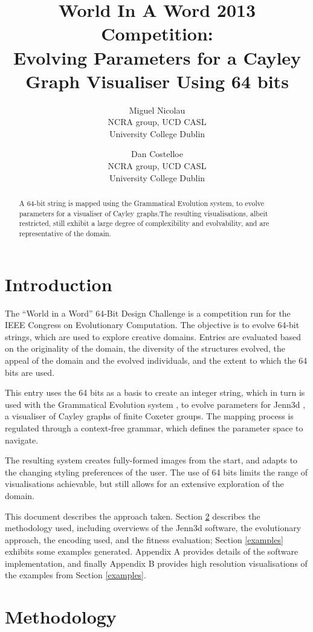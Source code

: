 \documentclass{article}
\title{World In A Word 2013 Competition:\\
Evolving Parameters for a Cayley Graph Visualiser Using 64 bits}
\author{Miguel Nicolau\\
NCRA group, UCD CASL\\
University College Dublin
\and Dan Costelloe\\
NCRA group, UCD CASL\\
University College Dublin}
\date{}
\begin{document}
\maketitle
\begin{abstract}
A 64-bit string is mapped using the Grammatical Evolution system, to evolve
parameters for a visualiser of Cayley graphs.The resulting visualisations,
albeit restricted, still exhibit a large degree of complexibility and
evolvability, and are representative of the domain.
\end{abstract}

\section{Introduction}
The ``World in a Word'' 64-Bit Design Challenge \cite{browne2013a} is a
competition run for the IEEE Congress on Evolutionary Computation. The
objective is to evolve 64-bit strings, which are used to explore creative
domains. Entries are evaluated based on the originality of the domain, the
diversity of the structures evolved, the appeal of the domain and the evolved
individuals, and the extent to which the 64 bits are used.

This entry uses the 64 bits as a basis to create an integer string, which in
turn is used with the Grammatical Evolution system \cite{oneill03b}, to
evolve parameters for Jenn3d \cite{obermeyer10a}, a visualiser of Cayley graphs of
finite Coxeter groups. The mapping process is regulated through a context-free
grammar, which defines the parameter space to navigate.

The resulting system creates fully-formed images from the start, and adapts to
the changing styling preferences of the user. The use of 64 bits limits the
range of visualisations achievable, but still allows for an extensive
exploration of the domain.

This document describes the approach taken. Section \ref{methodology} describes
the methodology used, including overviews of the Jenn3d software, the
evolutionary approach, the encoding used, and the fitness evaluation; Section
\ref{examples} exhibits some examples generated. Appendix A provides details of
the software implementation, and finally Appendix B provides high resolution
visualisations of the examples from Section \ref{examples}.

\section{Methodology}
\label{methodology}
\end{document}
